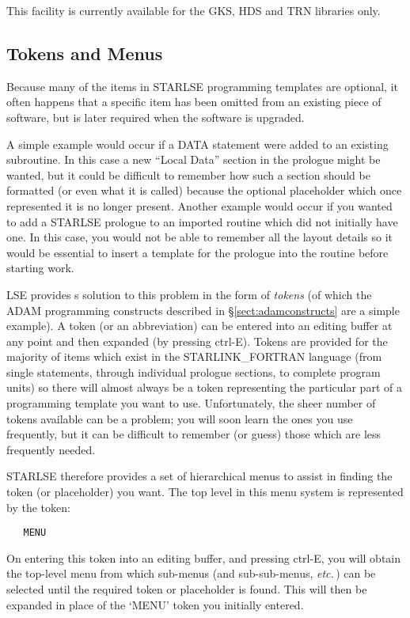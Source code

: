 This facility is currently available for the GKS, HDS and TRN libraries
only.


\subsection{Tokens and Menus}

Because many of the items in \mbox{STARLSE} programming templates are
optional, it often happens that a specific item has been omitted from an
existing piece of software, but is later required when the software is
upgraded.

A simple example would occur if a \mbox{DATA} statement were added to an
existing subroutine.
In this case a new ``Local Data'' section in the prologue might be wanted,
but it could be difficult to remember how such a section should be formatted
(or even what it is called) because the optional placeholder which once
represented it is no longer present.
Another example would occur if you wanted to add a \mbox{STARLSE} prologue
to an imported routine which did not initially have one.
In this case, you would not be able to remember all the layout details so
it would be essential to insert a template for the prologue into the routine
before starting work.

\mbox{LSE} provides s solution to this problem in the form of {\em tokens}
(of which the \mbox{ADAM} programming constructs described in
\S\ref{sect:adamconstructs} are a simple example).
A token (or an abbreviation) can be entered into an editing buffer at any
point and then expanded (by pressing ctrl-E).
Tokens are provided for the majority of items which exist in the
\mbox{STARLINK\_FORTRAN} language (from single statements, through
individual prologue sections, to complete program units) so there will
almost always be a token representing the particular part of a programming
template you want to use.
Unfortunately, the sheer number of tokens available can be a problem; you
will soon learn the ones you use frequently, but it can be difficult to
remember (or guess) those which are less frequently needed.

\mbox{STARLSE} therefore provides a set of hierarchical menus to assist in
finding the token (or placeholder) you want.
The top level in this menu system is represented by the token:

\begin{verbatim}
   MENU
\end{verbatim}

On entering this token into an editing buffer, and pressing ctrl-E, you will
obtain the top-level menu from which sub-menus (and sub-sub-menus, {\em
etc.}\,) can be selected until the required token or placeholder is found.
This will then be expanded in place of the `MENU' token you initially entered.

